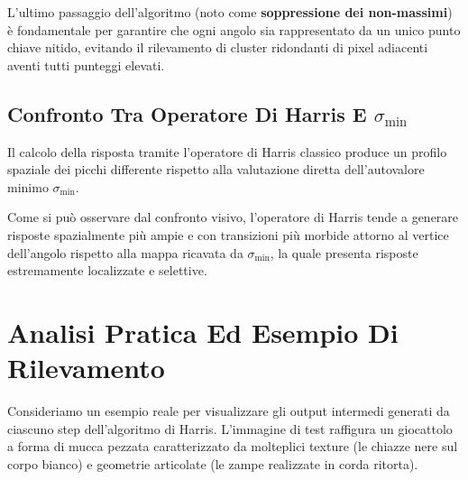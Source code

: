 ﻿\documentclass[11pt, a4paper]{article}
\begin{document}

L'ultimo passaggio dell'algoritmo (noto come \textbf{soppressione dei non-massimi}) è fondamentale per garantire che ogni angolo sia rappresentato da un unico punto chiave nitido, evitando il rilevamento di cluster ridondanti di pixel adiacenti aventi tutti punteggi elevati.


\subsection{Confronto Tra Operatore Di Harris E \texorpdfstring{$\sigma_{\min}$}{sigma\_min}}

Il calcolo della risposta tramite l'operatore di Harris classico produce un profilo spaziale dei picchi differente rispetto alla valutazione diretta dell'autovalore minimo $\sigma_{\min}$.


Come si può osservare dal confronto visivo, l'operatore di Harris tende a generare risposte spazialmente più ampie e con transizioni più morbide attorno al vertice dell'angolo rispetto alla mappa ricavata da $\sigma_{\min}$, la quale presenta risposte estremamente localizzate e selettive.

\newpage

\section{Analisi Pratica Ed Esempio Di Rilevamento}

Consideriamo un esempio reale per visualizzare gli output intermedi generati da ciascuno step dell'algoritmo di Harris. L'immagine di test raffigura un giocattolo a forma di mucca pezzata caratterizzato da molteplici texture (le chiazze nere sul corpo bianco) e geometrie articolate (le zampe realizzate in corda ritorta).

\end{document}
